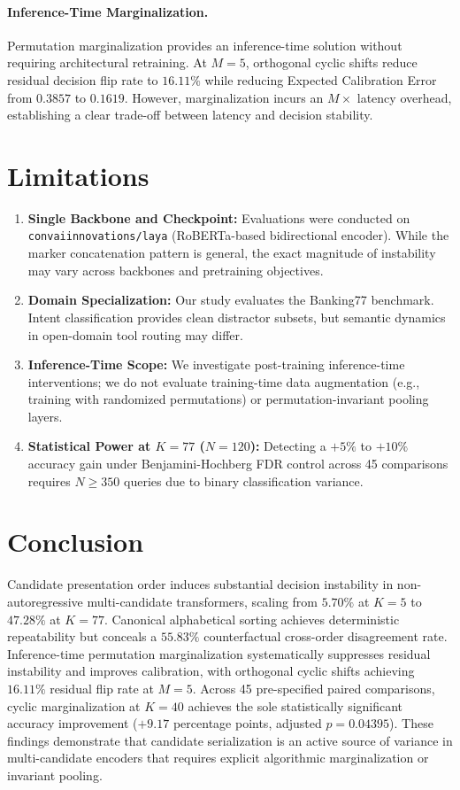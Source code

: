 \documentclass[11pt,a4paper]{article}
\begin{document}
\paragraph{Inference-Time Marginalization.}
Permutation marginalization provides an inference-time solution without requiring architectural retraining. At $M=5$, orthogonal cyclic shifts reduce residual decision flip rate to $16.11\%$ while reducing Expected Calibration Error from $0.3857$ to $0.1619$. However, marginalization incurs an $M\times$ latency overhead, establishing a clear trade-off between latency and decision stability.

\section{Limitations}

\begin{enumerate}
    \item \textbf{Single Backbone and Checkpoint:} Evaluations were conducted on \texttt{convaiinnovations/\allowbreak laya} (RoBERTa-based bidirectional encoder). While the marker concatenation pattern is general, the exact magnitude of instability may vary across backbones and pretraining objectives.
    \item \textbf{Domain Specialization:} Our study evaluates the Banking77 benchmark. Intent classification provides clean distractor subsets, but semantic dynamics in open-domain tool routing may differ.
    \item \textbf{Inference-Time Scope:} We investigate post-training inference-time interventions; we do not evaluate training-time data augmentation (e.g., training with randomized permutations) or permutation-invariant pooling layers.
    \item \textbf{Statistical Power at $K=77$ ($N=120$):} Detecting a $+5\%$ to $+10\%$ accuracy gain under Benjamini-Hochberg FDR control across 45 comparisons requires $N \ge 350$ queries due to binary classification variance.
\end{enumerate}

\section{Conclusion}

Candidate presentation order induces substantial decision instability in non-autoregressive multi-candidate transformers, scaling from $5.70\%$ at $K=5$ to $47.28\%$ at $K=77$. Canonical alphabetical sorting achieves deterministic repeatability but conceals a $55.83\%$ counterfactual cross-order disagreement rate. Inference-time permutation marginalization systematically suppresses residual instability and improves calibration, with orthogonal cyclic shifts achieving $16.11\%$ residual flip rate at $M=5$. Across 45 pre-specified paired comparisons, cyclic marginalization at $K=40$ achieves the sole statistically significant accuracy improvement ($+9.17$ percentage points, adjusted $p=0.04395$). These findings demonstrate that candidate serialization is an active source of variance in multi-candidate encoders that requires explicit algorithmic marginalization or invariant pooling.
\end{document}
